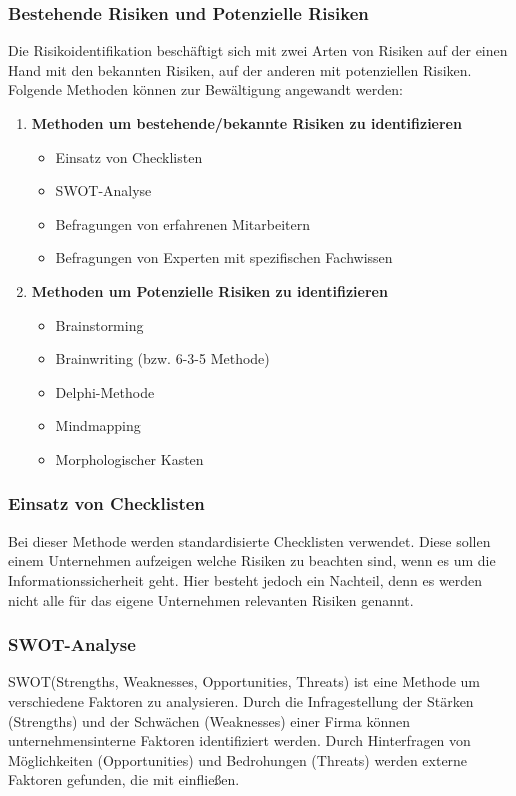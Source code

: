 \subsubsection{Bestehende Risiken und Potenzielle Risiken}
Die Risikoidentifikation beschäftigt sich mit zwei Arten von Risiken auf der einen Hand mit den bekannten Risiken, auf der anderen mit potenziellen Risiken. Folgende Methoden können zur Bewältigung angewandt werden:
\begin{enumerate}
    \item \textbf{Methoden um bestehende/bekannte Risiken zu identifizieren}
    \begin{itemize}
        \item Einsatz von Checklisten
        \item SWOT-Analyse
        \item Befragungen von erfahrenen Mitarbeitern
        \item Befragungen von Experten mit spezifischen Fachwissen
    \end{itemize}
    \item \textbf{Methoden um Potenzielle Risiken zu identifizieren}
    \begin{itemize}
    	\item Brainstorming
    	\item Brainwriting (bzw. 6-3-5 Methode)
    	\item Delphi-Methode
    	\item Mindmapping
    	\item Morphologischer Kasten
    \end{itemize}
\end{enumerate}

\subsubsection{Einsatz von Checklisten}
Bei dieser Methode werden standardisierte Checklisten verwendet. Diese sollen einem Unternehmen aufzeigen welche Risiken zu beachten sind, wenn es um die Informationssicherheit geht. Hier besteht jedoch ein Nachteil, denn es werden nicht alle für das eigene Unternehmen relevanten Risiken genannt.

\subsubsection{SWOT-Analyse}
SWOT(Strengths, Weaknesses, Opportunities, Threats) ist eine Methode um verschiedene Faktoren zu analysieren. 
Durch die Infragestellung der Stärken (Strengths) und der Schwächen (Weaknesses) einer Firma können unternehmensinterne Faktoren identifiziert werden.
Durch Hinterfragen von Möglichkeiten (Opportunities) und Bedrohungen (Threats) werden externe Faktoren gefunden, die mit einfließen.



